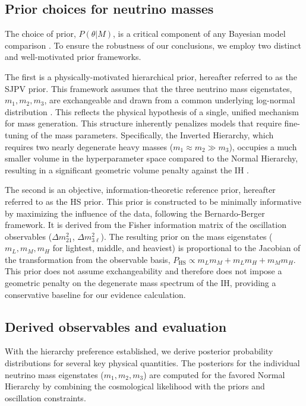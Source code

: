 \documentclass[]{article}
\begin{document}
\subsection{Prior choices for neutrino masses}
The choice of prior, $P(\theta|M)$, is a critical component of any Bayesian model comparison \citep{bayarri2012criteriabayesianmodelchoice,llorente2022safeusepriordensities}. To ensure the robustness of our conclusions, we employ two distinct and well-motivated prior frameworks.

The first is a physically-motivated hierarchical prior, hereafter referred to as the SJPV prior. This framework assumes that the three neutrino mass eigenstates, $m_1, m_2, m_3$, are exchangeable and drawn from a common underlying log-normal distribution \citep{schwetz2017commentstrongevidencenormal}. This reflects the physical hypothesis of a single, unified mechanism for mass generation. This structure inherently penalizes models that require fine-tuning of the mass parameters. Specifically, the Inverted Hierarchy, which requires two nearly degenerate heavy masses ($m_1 \approx m_2 \gg m_3$), occupies a much smaller volume in the hyperparameter space compared to the Normal Hierarchy, resulting in a significant geometric volume penalty against the IH \citep{schwetz2017commentstrongevidencenormal}.

The second is an objective, information-theoretic reference prior, hereafter referred to as the HS prior. This prior is constructed to be minimally informative by maximizing the influence of the data, following the Bernardo-Berger framework. It is derived from the Fisher information matrix of the oscillation observables ($\Delta m^2_{21}$, $\Delta m^2_{3\ell}$). The resulting prior on the mass eigenstates ($m_L, m_M, m_H$ for lightest, middle, and heaviest) is proportional to the Jacobian of the transformation from the observable basis, $P_{\text{HS}} \propto m_L m_M + m_L m_H + m_M m_H$. This prior does not assume exchangeability and therefore does not impose a geometric penalty on the degenerate mass spectrum of the IH, providing a conservative baseline for our evidence calculation.

\subsection{Derived observables and evaluation}
With the hierarchy preference established, we derive posterior probability distributions for several key physical quantities. The posteriors for the individual neutrino mass eigenstates ($m_1, m_2, m_3$) are computed for the favored Normal Hierarchy by combining the cosmological likelihood with the priors and oscillation constraints.
\end{document}
